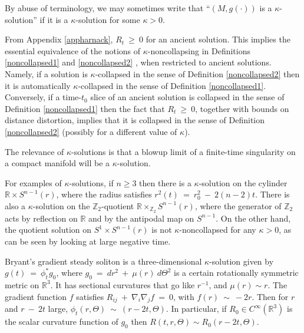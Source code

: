 \documentclass[12pt]{amsart}
\newcommand{\R}{{\mathbb R}}
\newcommand{\Z}{{\mathbb Z}}
\numberwithin{equation}{section}
\theoremstyle{plain}
\theoremstyle{definition}
\theoremstyle{remark}
\begin{document}
By abuse of terminology, we may sometimes write that 
``$(M, g(\cdot))$ is a $\kappa$-solution'' if it is a $\kappa$-solution
for some $\kappa > 0$.


From Appendix \ref{appharnack},
$R_t  \:  \ge \: 0$ for an ancient solution.
This implies the essential equivalence of the notions of
$\kappa$-noncollapsing in
Definitions \ref{noncollapsed1} and \ref{noncollapsed2} , when
restricted to ancient solutions.
Namely, if a solution is $\kappa$-collapsed in the sense of 
Definition \ref{noncollapsed2} then it is
automatically $\kappa$-collapsed in the sense of 
Definition \ref{noncollapsed1}.  Conversely,
if a time-$t_0$ slice of an ancient solution is collapsed in the sense
of Definition \ref{noncollapsed1} 
then the fact that $R_t  \:  \ge \: 0$, together with bounds on
distance distortion, implies that it is collapsed in the sense of
Definition \ref{noncollapsed2} (possibly for a different value of $\kappa$).

The relevance of $\kappa$-solutions is that a blowup limit of a
finite-time singularity on a compact manifold will be a $\kappa$-solution.

For examples of $\kappa$-solutions, if $n \ge 3$ then 
there is a $\kappa$-solution
on the cylinder $\R \times S^{n-1}(r)$,
where the radius satisfies $r^2(t) \: = \: r_0^2 \: - \:
2(n-2)t$. There is also a $\kappa$-solution on the
$\Z_2$-quotient $\R \times_{\Z_2} S^{n-1}(r)$, where
the generator of $\Z_2$ acts by reflection on $\R$ and by
the antipodal map on $S^{n-1}$.
On the other hand,  the quotient solution on
$S^1 \times S^{n-1}(r)$ is not $\kappa$-noncollapsed for any 
$\kappa > 0$,
as can be seen by looking at large negative time.

Bryant's gradient steady soliton is a 
three-dimensional $\kappa$-solution given by
$g(t) \: = \: \phi_t^* g_0$, where $g_0 \: = \: dr^2 \: + \: \mu(r) \: 
d\Theta^2$ is a certain rotationally symmetric metric on $\R^3$. It has
sectional curvatures that go like $r^{-1}$, and $\mu(r) \sim r$.
The gradient function $f$ satisfies $R_{ij} \: + \: \nabla_i \nabla_j f
\: = \: 0$, with $f(r) \: \sim \: -2r$. Then for $r$ and $r \: - \: 2t$
large, $\phi_t(r, \Theta) \: \sim \: (r-2t, \Theta)$. In particular,
if $R_0 \in C^\infty(\R^3)$ is the scalar curvature function of
$g_0$ then $R(t, r, \Theta) \sim R_0(r-2t, \Theta)$. 
\end{document}
